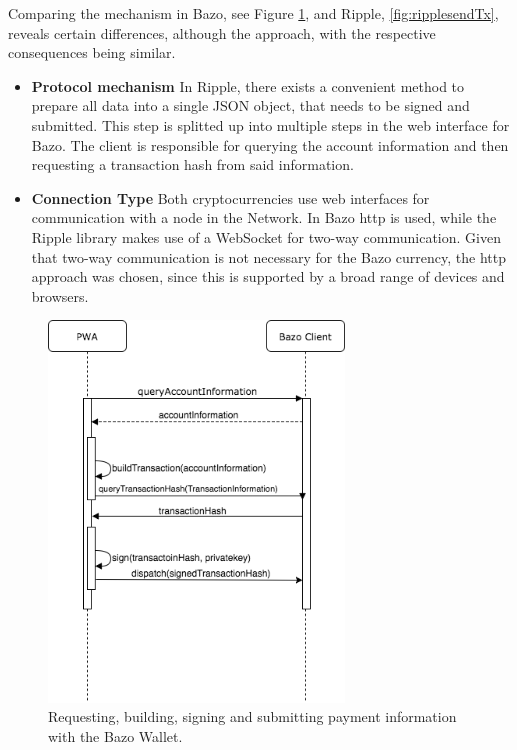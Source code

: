 Comparing the mechanism in Bazo, see Figure \ref{fig:TransactionProcess}, and Ripple, \ref{fig:ripplesendTx}, reveals certain differences, although the approach, with the respective consequences being similar.
\begin{itemize}
\item \textbf{Protocol mechanism} In Ripple, there exists a convenient method to prepare all data into a single JSON object, that needs to be signed and submitted. This step is splitted up into multiple steps in the web interface for Bazo. The client is responsible for querying the account information and then requesting a transaction hash from said information.
\item \textbf{Connection Type} Both cryptocurrencies use web interfaces for communication with a node in the Network. In Bazo http is used, while the Ripple library makes use of a WebSocket for two-way communication. Given that two-way communication is not necessary for the Bazo currency, the http approach was chosen, since this is supported by a broad range of devices and browsers.
\end{itemize}

\begin{figure}
\centering
\includegraphics[width=0.7\textwidth]{diagrams/transactionProcess.png}
\caption{\label{fig:TransactionProcess}Requesting, building, signing and submitting payment information with the Bazo Wallet.}
\end{figure}


